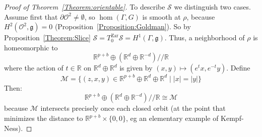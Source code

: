 \documentclass[a4paper,11pt]{article}
\begin{document}
\begin{proof}[Proof of Theorem~\ref{Theorem:orientable}]
%
%

%
\bigskip

To describe $\mathcal S$ we distinguish two cases.
Assume first that $\partial\mathcal O^2\neq\emptyset$, so
$\hom(\Gamma, G)$ is 
 smooth at $\rho$,
because $H^2(\mathcal O^2,\mathfrak g)=0$ 
(Proposition~\ref{Proposition:Goldman}). So by    Proposition~\ref{Theorem:Slice} 
$\mathcal S= T^{\textrm{Zar}}_0\mathcal S =  H^1(\Gamma,\mathfrak{g})$. 
% 
% 
% 
Thus, a neighborhood of $\rho$ is homeomorphic to
$$
\mathbb{R}^{p+b}\oplus  (\mathbb R^{d}\oplus \mathbb R^{-d})/\!/\mathbb R
$$
where the action of $t\in\mathbb R$ on $\mathbb R^{d}\oplus \mathbb R^{d}$ is given by 
$(x,y)\mapsto (e^tx, e^{-t} y)$. Define
\begin{equation}
 \label{eqn:M}
\mathcal M= \{(z,x,y)\in\mathbb R^{p+b}\oplus \mathbb R^{d}\oplus \mathbb R^{d}\mid 
|x|=|y|\} 
\end{equation}
Then:
$$
\mathbb{R}^{p+b}\oplus  (\mathbb R^{d}\oplus \mathbb R^{-d})/\!/\mathbb R\cong \mathcal M
$$
because $\mathcal M$ intersects precisely once each closed orbit (at the point that minimizes the distance to 
$\mathbb{R}^{p+b}\times\{0,0\}$, eg an elementary example of Kempf-Ness).

\bigskip


\end{proof}
\end{document}

